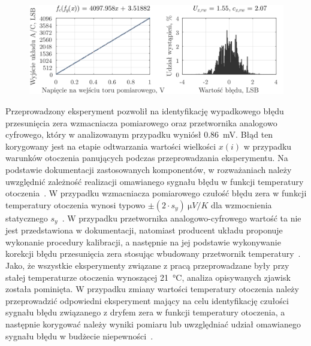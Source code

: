 \begin{figure}[htb!]
\begin{center}
\includegraphics{obrazki/static_adcout}
\end{center}
\end{figure}

Przeprowadzony eksperyment pozwolił na identyfikację wypadkowego błędu przesunięcia zera wzmacniacza pomiarowego oraz przetwornika analogowo cyfrowego, który w analizowanym przypadku wyniósł \qty{0.86}{mV}. Błąd ten korygowany jest na etapie odtwarzania wartości wielkości $x(i)$ w przypadku warunków otoczenia panujących podczas przeprowadzania eksperymentu. Na podstawie dokumentacji zastosowanych komponentów, w rozważaniach należy uwzględnić zależność realizacji omawianego sygnału błędu w funkcji temperatury otoczenia~\cite{microchip_manual, stm_f411}. W przypadku wzmacniacza pomiarowego czułość błędu zera w funkcji temperatury otoczenia wynosi typowo $\pm (2 \cdot s_{y})~\unit{\micro V \per K}$ dla wzmocnienia statycznego $s_{y}$~\cite{microchip_manual}. W przypadku przetwornika analogowo-cyfrowego wartość ta nie jest przedstawiona w dokumentacji, natomiast producent układu proponuje wykonanie procedury kalibracji, a następnie na jej podstawie wykonywanie korekcji błędu przesunięcia zera stosując wbudowany przetwornik temperatury~\cite{stm_adc}. Jako, że wszystkie eksperymenty związane z pracą przeprowadzane były przy stałej temperaturze otoczenia wynoszącej \qty{21}{\degreeCelsius}, analiza opisywanych zjawisk została pominięta. W przypadku zmiany wartości temperatury otoczenia należy przeprowadzić odpowiedni eksperyment mający na celu identyfikację czułości sygnału błędu związanego z dryfem zera w funkcji temperatury otoczenia, a następnie korygować należy wyniki pomiaru lub uwzględniać udział omawianego sygnału błędu w budżecie niepewności~\cite{jcgm_guide}. 

